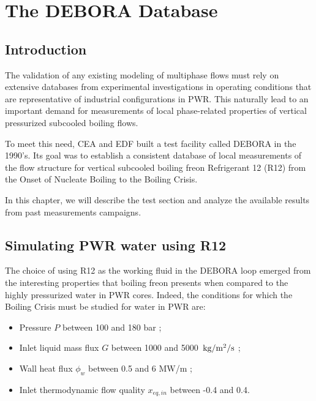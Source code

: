 
\chapter{The DEBORA Database} %
\label{chap:debora}

\minitoc

\section{Introduction}

\label{ch:debora} %

The validation of any existing modeling of multiphase flows must rely on extensive databases from experimental investigations in operating conditions that are representative of industrial configurations in PWR. This naturally lead to an important demand for measurements of local phase-related properties of vertical pressurized subcooled boiling flows. 

\npar
To meet this need, CEA and EDF built a test facility called DEBORA in the 1990's. Its goal was to establish a consistent database of local measurements of the flow structure for vertical subcooled boiling freon Refrigerant 12 (R12) from the Onset of Nucleate Boiling to the Boiling Crisis.

\npar

In this chapter, we will describe the test section and analyze the available results from past measurements campaigns.


\section{Simulating PWR water using R12}

The choice of using R12 as the working fluid in the DEBORA loop emerged from the interesting properties that boiling freon presents when compared to the highly pressurized water in PWR cores. Indeed, the conditions for which the Boiling Crisis must be studied for water in PWR are:

\begin{itemize}
\item Pressure $P$ between 100 and 180 bar ;
\item Inlet liquid mass flux $G$ between 1000 and 5000~$\text{kg/m$^{2}$/s}$ ;
\item Wall heat flux $\phi_{w}$ between 0.5 and 6 MW/m ;
\item Inlet thermodynamic flow quality $x_{eq,in}$ between -0.4 and 0.4.
\end{itemize}

